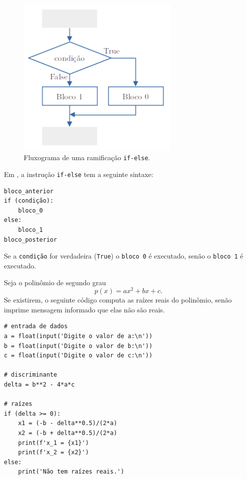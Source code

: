 \begin{figure}[H]
  \centering
  \includegraphics[width=0.7\textwidth]{./cap_progest/dados/fig_fg_else/fig}
  \caption{Fluxograma de uma ramificação \lstinline+if-else+.}
  \label{cap_progest_sec_ramifica:fig:fg_else}
\end{figure}

Em {\python}, a instrução \lstinline+if-else+ tem a seguinte sintaxe:

\begin{lstlisting}
bloco_anterior
if (condição):
    bloco_0
else:
    bloco_1
bloco_posterior
\end{lstlisting}

Se a {\lstinline+condição+} for verdadeira ({\lstinline+True+}) o {\lstinline+bloco 0+} é executado, senão o {\lstinline+bloco 1+} é executado.

\begin{ex}
  Seja o polinômio de segundo grau
  \begin{equation}
    p(x) = ax^2 + bx + c.
  \end{equation}
  Se existirem, o seguinte código computa as raízes reais do polinômio, senão imprime mensagem informado que elas não são reais.

\begin{lstlisting}
# entrada de dados
a = float(input('Digite o valor de a:\n'))
b = float(input('Digite o valor de b:\n'))
c = float(input('Digite o valor de c:\n'))

# discriminante
delta = b**2 - 4*a*c

# raízes
if (delta >= 0):
    x1 = (-b - delta**0.5)/(2*a)
    x2 = (-b + delta**0.5)/(2*a)
    print(f'x_1 = {x1}')
    print(f'x_2 = {x2}')
else:
    print('Não tem raízes reais.')
\end{lstlisting}

\end{ex}

